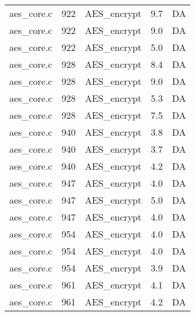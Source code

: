 \begin{table}[!ht]
\begin{tabular}{lrlrr}
aes\_core.c& 922&AES\_encrypt&9.7 &DA\\
aes\_core.c& 922&AES\_encrypt&9.0 &DA\\
aes\_core.c& 922&AES\_encrypt&5.0 &DA\\
aes\_core.c& 928&AES\_encrypt&8.4 &DA\\
aes\_core.c& 928&AES\_encrypt&9.0 &DA\\
aes\_core.c& 928&AES\_encrypt&5.3 &DA\\
aes\_core.c& 928&AES\_encrypt&7.5 &DA\\
aes\_core.c& 940&AES\_encrypt&3.8 &DA\\
aes\_core.c& 940&AES\_encrypt&3.7 &DA\\
aes\_core.c& 940&AES\_encrypt&4.2 &DA\\
aes\_core.c& 947&AES\_encrypt&4.0 &DA\\
aes\_core.c& 947&AES\_encrypt&5.0 &DA\\
aes\_core.c& 947&AES\_encrypt&4.0 &DA\\
aes\_core.c& 954&AES\_encrypt&4.0 &DA\\
aes\_core.c& 954&AES\_encrypt&4.0 &DA\\
aes\_core.c& 954&AES\_encrypt&3.9 &DA\\
aes\_core.c& 961&AES\_encrypt&4.1 &DA\\
aes\_core.c& 961&AES\_encrypt&4.2 &DA\\
\hline
\end{tabular}
\renewcommand{\baselinestretch}{1.0}\selectfont
\end{table}
